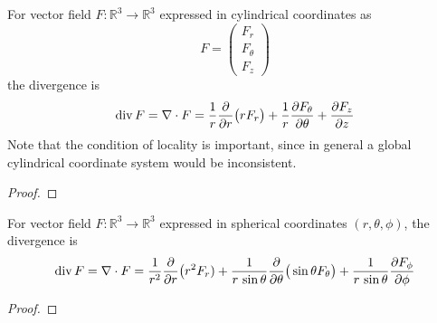   \begin{lemma}
    \label{thm:divergence-in-cylindrical-coordinates}
		For vector field $F: \mathbb{R}^3 \to \mathbb{R}^3$ expressed in cylindrical coordinates as 
		\begin{equation}
			F = \begin{pmatrix} F_r \\ F_\theta \\ F_z \end{pmatrix}
		\end{equation}
		the divergence is
		\begin{equation}
			\operatorname{div} F = \nabla \cdot F = \frac{1}{r} \frac{\partial}{\partial r} \big(r F_r \big) + \frac{1}{r} \frac{\partial F_\theta}{\partial \theta} + \frac{\partial F_z}{\partial z}
		\end{equation}
		Note that the condition of locality is important, since in general a global cylindrical coordinate system would be inconsistent. 
  \end{lemma}
	\begin{proof}
	  
	\end{proof}

  \begin{lemma}
    \label{thm:divergence-in-spherical-coordinates}
		For vector field $F: \mathbb{R}^3 \to \mathbb{R}^3$ expressed in spherical coordinates $(r, \theta, \phi)$, the divergence is 
		\begin{equation}
			\operatorname{div} F = \nabla \cdot F = \frac{1}{r^2} \frac{\partial}{\partial r} \big( r^2 F_r) + \frac{1}{r \, \sin{\theta}} \frac{\partial}{\partial \theta} \big( \sin{\theta} F_\theta\big) + \frac{1}{r\, \sin{\theta}} \frac{\partial F_\phi}{\partial \phi}
		\end{equation}
  \end{lemma}
	\begin{proof}
	  
	\end{proof}

